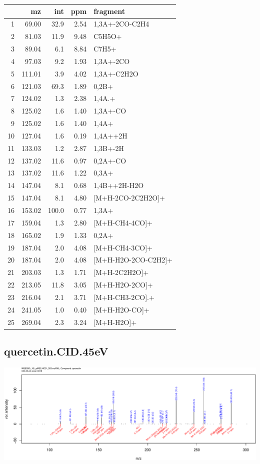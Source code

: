 \documentclass[]{article}
\begin{document}
\begin{table}[ht]
\centering
\begin{tabular}{rrrrl}
  \toprule
 & mz & int & ppm & fragment \\ 
  \midrule
1 & 69.00 & 32.9 & 2.54 & 1,3A+-2CO-C2H4 \\ 
  2 & 81.03 & 11.9 & 9.48 & C5H5O+ \\ 
  3 & 89.04 & 6.1 & 8.84 & C7H5+ \\ 
  4 & 97.03 & 9.2 & 1.93 & 1,3A+-2CO \\ 
  5 & 111.01 & 3.9 & 4.02 & 1,3A+-C2H2O \\ 
  6 & 121.03 & 69.3 & 1.89 & 0,2B+ \\ 
  7 & 124.02 & 1.3 & 2.38 & 1,4A.+ \\ 
  8 & 125.02 & 1.6 & 1.40 & 1,3A+-CO \\ 
  9 & 125.02 & 1.6 & 1.40 & 1,4A+ \\ 
  10 & 127.04 & 1.6 & 0.19 & 1,4A++2H \\ 
  11 & 133.03 & 1.2 & 2.87 & 1,3B+-2H \\ 
  12 & 137.02 & 11.6 & 0.97 & 0,2A+-CO \\ 
  13 & 137.02 & 11.6 & 1.22 & 0,3A+ \\ 
  14 & 147.04 & 8.1 & 0.68 & 1,4B++2H-H2O \\ 
  15 & 147.04 & 8.1 & 4.80 & [M+H-2CO-2C2H2O]+ \\ 
  16 & 153.02 & 100.0 & 0.77 & 1,3A+ \\ 
  17 & 159.04 & 1.3 & 2.80 & [M+H-CH4-4CO]+ \\ 
  18 & 165.02 & 1.9 & 1.33 & 0,2A+ \\ 
  19 & 187.04 & 2.0 & 4.08 & [M+H-CH4-3CO]+ \\ 
  20 & 187.04 & 2.0 & 4.08 & [M+H-H2O-2CO-C2H2]+ \\ 
  21 & 203.03 & 1.3 & 1.71 & [M+H-2C2H2O]+ \\ 
  22 & 213.05 & 11.8 & 3.05 & [M+H-H2O-2CO]+ \\ 
  23 & 216.04 & 2.1 & 3.71 & [M+H-CH3-2CO].+ \\ 
  24 & 241.05 & 1.0 & 0.40 & [M+H-H2O-CO]+ \\ 
  25 & 269.04 & 2.3 & 3.24 & [M+H-H2O]+ \\ 
   \bottomrule
\end{tabular}
\end{table}

\clearpage\subsection{quercetin.CID.45eV}
\includegraphics[width=\textwidth]{WEB350_files/figure-latex/unnamed-chunk-3-28}
\end{document}
